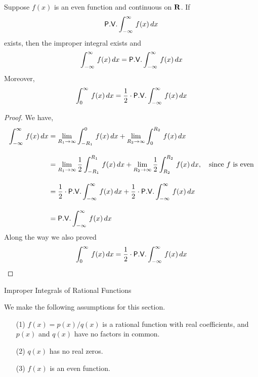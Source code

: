 \vspace*{1em}

\begin{lemma}
Suppose $f(x)$ is an even function and continuous on $\mathbf R$. If 
\[\mathsf{P.V.}\int_{-\infty}^\infty\,f(x)\,dx\]
exists, then the improper integral exists and
\[\int_{-\infty}^\infty\,f(x)\,dx = \mathsf{P.V.}\int_{-\infty}^\infty\,f(x)\,dx\]
Moreover,
\[\int_0^\infty\,f(x)\,dx = \frac{1}{2}\cdot\mathsf{P.V.}\int_{-\infty}^\infty\,f(x)\,dx\]
\end{lemma}
\begin{proof}
We have,
\begin{align*}
\int_{-\infty}^\infty\,f(x)\,dx &=  \lim_{R_1 \to \infty}\int^0_{-R_1}\,f(x)\,dx + \lim_{R_2 \to \infty}\int_0^{R_2}\,f(x)\,dx\\[1em]
 &=  \lim_{R_1 \to \infty}\frac{1}{2}\int^{R_1}_{-R_1}\,f(x)\,dx + \lim_{R_2 \to \infty}\frac{1}{2}\int_{R_2}^{R_2}\,f(x)\,dx,\quad \text{since $f$ is even}\\[1em]
 &=  \frac{1}{2}\cdot\mathsf{P.V.}\int_{-\infty}^\infty\,f(x)\,dx + \frac{1}{2}\cdot\mathsf{P.V.}\int_{-\infty}^\infty\,f(x)\,dx\\[1em]
 &=  \mathsf{P.V.}\int_{-\infty}^\infty\,f(x)\,dx
\end{align*}
Along the way we also proved
\[\int_0^\infty\,f(x)\,dx = \frac{1}{2}\cdot\mathsf{P.V.}\int_{-\infty}^\infty\,f(x)\,dx\]
\end{proof}

\vspace*{1em}

\begin{mdframed}
\begin{center}
{\Large Improper Integrals of Rational Functions}
\end{center}
\end{mdframed}

\begin{discussion}
We make the following assumptions for this section.
\begin{itemize}
\item[(1)] $f(x) = p(x)/q(x)$ is a rational function with real coefficients, and $p(x)$ and $q(x)$ have no factors in common.
\item[(2)] $q(x)$ has no real zeros.
\item[(3)] $f(x)$ is an even function.
\end{itemize}
\end{discussion}

\vspace*{1em}

